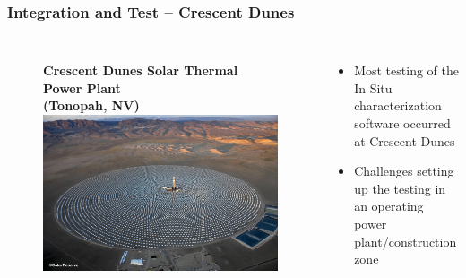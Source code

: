 \documentclass[aspectratio=169]{beamer}
\begin{document}
\begin{frame}
  \frametitle{Integration and Test -- Crescent Dunes}
  \begin{columns}[c]
    \begin{figure}
      \textbf{Crescent Dunes Solar Thermal Power Plant\\
        (Tonopah, NV)}
      \includegraphics[width=\linewidth]{CDSEP.jpg}
    \end{figure}

    \begin{itemize}
    \item Most testing of the In Situ characterization software
      occurred at Crescent Dunes
    \item Challenges setting up the testing in an operating power
      plant/construction zone
    \end{itemize}
  \end{columns}
\end{frame}
\end{document}
